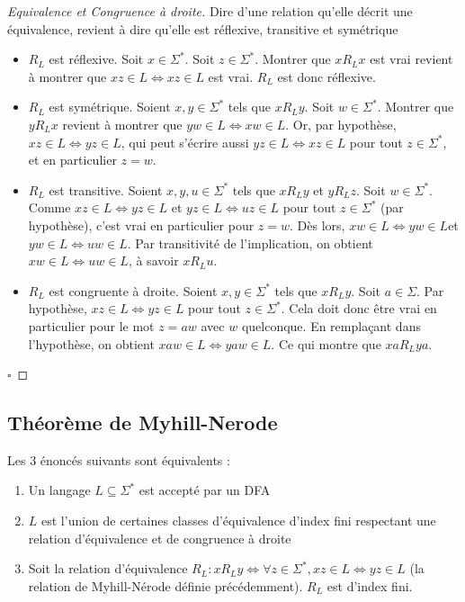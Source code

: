 \begin{proof}[Equivalence et Congruence à droite]
	Dire d'une relation qu'elle décrit une équivalence, revient à dire qu'elle est réflexive, transitive et symétrique
\begin{itemize}
		\item $R_L$ est réflexive. Soit $x \in \Sigma^*$. Soit $z \in \Sigma^*$. Montrer que $xR_Lx$ est vrai revient à montrer que $ xz \in L \Leftrightarrow xz \in L$ est vrai. $R_L$ est donc réflexive.
		\item $R_L$ est symétrique. Soient $x, y \in \Sigma^*$ tels que $xR_Ly$. Soit $w \in \Sigma^*$. Montrer que $yR_Lx$ revient à montrer que $ yw \in L \Leftrightarrow xw \in L$. Or, par hypothèse, $ xz \in L \Leftrightarrow yz \in L$, qui peut s'écrire aussi $ yz \in L \Leftrightarrow xz \in L$ pour tout $z \in \Sigma^*$, et en particulier $z=w$.
		\item $R_L$ est transitive. Soient $x,y,u \in \Sigma^*$ tels que $xR_Ly$ et $yR_Lz$. Soit $w \in \Sigma^*$. Comme $ xz \in L \Leftrightarrow yz \in L$ et $ yz \in L \Leftrightarrow uz \in L$ pour tout $z \in \Sigma^*$ (par hypothèse), c'est vrai en particulier pour $z=w$. Dès lors,  $ xw \in L \Leftrightarrow yw \in L$et $ yw \in L \Leftrightarrow uw \in L$. Par transitivité de l'implication, on obtient $ xw \in L \Leftrightarrow uw \in L$, à savoir $xR_Lu$.
		\item $R_L$ est congruente à droite. Soient $x,y \in \Sigma^*$ tels que $xR_Ly$. Soit $a \in \Sigma$. Par hypothèse, $ xz \in L \Leftrightarrow yz \in L$ pour tout $z \in \Sigma^*$. Cela doit donc être vrai en particulier pour le mot $z=aw$ avec $w$ quelconque. En remplaçant dans l'hypothèse, on obtient  $ xaw \in L \Leftrightarrow yaw \in L$. Ce qui montre que $xaR_Lya$.
	\end{itemize}

\hfill$\square$
\end{proof}


\subsection{Théorème de Myhill-Nerode}

	\begin{theorem}
		Les 3 énoncés suivants sont équivalents :
		\begin{enumerate}
			\item Un langage $L\subseteq\Sigma^*$ est accepté par un DFA
			\item $L$ est l'union de certaines classes d'équivalence d'index fini respectant une relation d'équivalence et de congruence à droite
			\item Soit la relation d'équivalence $R_L : xR_Ly \Leftrightarrow \forall z \in \Sigma^*, xz \in L \Leftrightarrow yz \in L$ (la relation de Myhill-Nérode définie précédemment). $R_L$ est d'index fini.
		\end{enumerate}
	\end{theorem}

